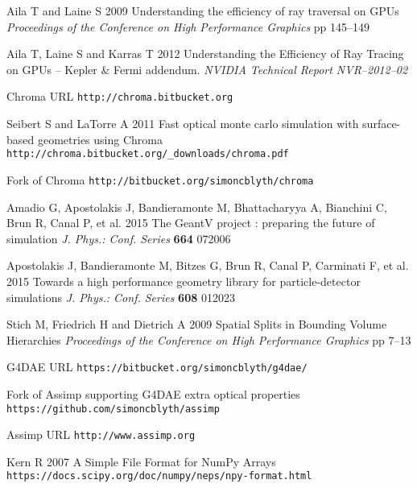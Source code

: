 \documentclass[a4paper]{jpconf}
\begin{document}
\begin{thebibliography}{9}
Aila T and Laine S 
2009
Understanding the efficiency of ray traversal on GPUs
{\it Proceedings of the Conference on High Performance Graphics} pp 145--149

Aila T, Laine S and Karras T
2012
Understanding the Efficiency of Ray Tracing on GPUs – Kepler \& Fermi addendum. 
{\it NVIDIA Technical Report NVR–2012–02}

Chroma URL {\tt http://chroma.bitbucket.org}

Seibert S and LaTorre A 
2011 
Fast optical monte carlo simulation with surface-based geometries using Chroma {\tt http://chroma.bitbucket.org/\_downloads/chroma.pdf}

Fork of Chroma {\tt http://bitbucket.org/simoncblyth/chroma}

Amadio G, Apostolakis J, Bandieramonte M, Bhattacharyya A, Bianchini C, Brun R, Canal P, et al.
2015
The GeantV project : preparing the future of simulation 
{\it J. Phys.: Conf. Series} {\bf 664} 072006

Apostolakis J, Bandieramonte M, Bitzes G, Brun R, Canal P, Carminati F, et al. 
2015
Towards a high performance geometry library for particle-detector simulations
{\it J. Phys.: Conf. Series} {\bf 608} 012023

Stich M, Friedrich H and Dietrich A 
2009
Spatial Splits in Bounding Volume Hierarchies
{\it Proceedings of the Conference on High Performance Graphics} pp 7--13



G4DAE URL {\tt https://bitbucket.org/simoncblyth/g4dae/}

Fork of Assimp supporting G4DAE extra optical properties {\tt https://github.com/simoncblyth/assimp}

Assimp URL {\tt http://www.assimp.org}


Kern R
2007
A Simple File Format for NumPy Arrays
{\tt https://docs.scipy.org/doc/numpy/neps/npy-format.html}


\end{thebibliography}
\end{document}
